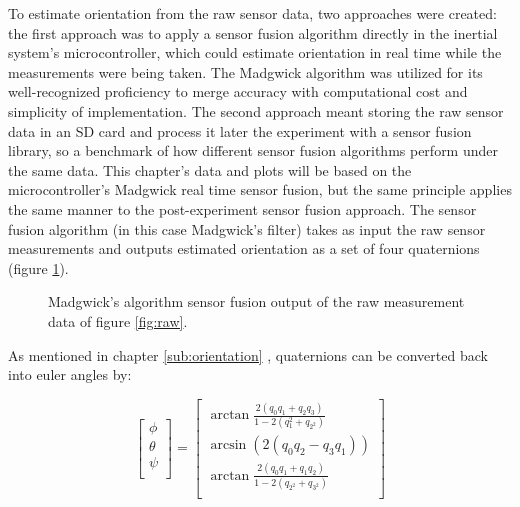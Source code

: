 To estimate orientation from the raw sensor data, two approaches were created: the first approach was to apply a sensor fusion algorithm directly in the inertial system's microcontroller, which could estimate orientation in real time while the measurements were being taken. The Madgwick algorithm was utilized for its well-recognized proficiency to merge accuracy with computational cost and simplicity of implementation. The second approach meant storing the raw sensor data in an SD card and process it later the experiment with a sensor fusion library, so a benchmark of how different sensor fusion algorithms perform under the same data. This chapter's data and plots will be based on the microcontroller's Madgwick real time sensor fusion, but the same principle applies the same manner to the post-experiment sensor fusion approach. The sensor fusion algorithm (in this case Madgwick's filter) takes as input the raw sensor measurements and outputs estimated orientation as a set of four quaternions (figure \ref{fig:fusion_output}).


\begin{figure}[!h]
    \centering
    \resizebox{0.8\linewidth}{!}{}
    \caption{Madgwick's algorithm sensor fusion output of the raw measurement data of figure \ref{fig:raw}.}
    \label{fig:fusion_output}
\end{figure}


As mentioned in chapter \ref{sub:orientation} , quaternions can be converted back into euler angles by:

\begin{equation}
    \begin{bmatrix}
        \phi   \\
        \theta \\
        \psi   \\
    \end{bmatrix}
    =
    \begin{bmatrix}
        \arctan \frac{2(q_0q_1+q_2q_3)}{1-2(q{_1^2}+q_{2^2})} \\
        \arcsin (2(q_0q_2-q_3q_1))                            \\
        \arctan \frac{2(q_0q_1+q_1q_2)}{1-2(q_{2^2}+q_{3^2})} \\
    \end{bmatrix}
\end{equation}


